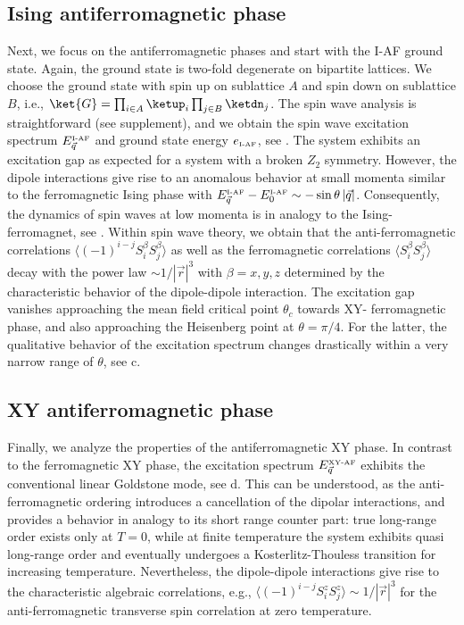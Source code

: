 \subsection{Ising antiferromagnetic phase}
Next, we focus on the antiferromagnetic phases and start with the I-AF ground state.
Again, the ground state is two-fold degenerate on bipartite lattices. We choose the ground state with spin up on sublattice $A$
and spin down on sublattice $B$, i.e., $\ket{G} = \prod_{i \in A} \ketup_{i} \prod_{j\in B} \ketdn_{j}$.
The spin wave analysis is straightforward (see supplement), and we obtain
the spin wave excitation spectrum $ E^{\mbox{\tiny I-AF}}_{\vec q}$ and ground state energy $ e_{\mbox{\tiny I-AF}}$, see .
The system exhibits an excitation gap as expected for a system with a broken $Z_{2}$ symmetry.
However, the dipole interactions give rise to an anomalous behavior at small momenta similar to
the ferromagnetic Ising phase with $E^{\mbox{\tiny I-AF}}_{\vec q}- E^{\mbox{\tiny I-AF}}_{0} \sim -
\sin \theta\, |{\vec q}|$. Consequently, the dynamics of spin waves at low momenta is in analogy to the
Ising-ferromagnet, see . Within spin wave theory, we obtain that the anti-ferromagnetic correlations
$\langle (-1)^{i-j} S_{i}^{\beta}S_{j}^{\beta} \rangle$
as well as the ferromagnetic correlations $\langle S_{i}^{\beta}S_{j}^{\beta} \rangle$ decay with the
power law $\sim1/ |{\vec r}|^{3}$ with $\beta = x,y,z$ determined by the characteristic behavior of the dipole-dipole interaction.
The excitation gap vanishes approaching the mean field critical point $\theta_{c}$ towards XY- ferromagnetic
phase, and also approaching the Heisenberg point at $\theta = \pi/4$. For the latter, the qualitative behavior of the excitation spectrum
changes drastically within a very narrow range of $\theta$, see c.



\subsection{XY antiferromagnetic phase}
Finally, we analyze the properties of the antiferromagnetic XY phase.
In contrast to the ferromagnetic XY phase, the excitation spectrum $E^{\mbox{\tiny XY-AF}}_{\vec q}$
exhibits the conventional linear Goldstone mode, see d. This can be understood, as the
anti-ferromagnetic ordering introduces a cancellation of the dipolar interactions, and provides a behavior in analogy to
its short range counter part: true long-range order exists only at $T=0$, while at finite temperature the system
exhibits quasi long-range order and eventually undergoes a Kosterlitz-Thouless transition for increasing temperature.
Nevertheless, the dipole-dipole interactions give rise to the characteristic algebraic correlations, e.g.,
$\langle (-1)^{i-j}S_{i}^{z}S_{j}^{z} \rangle \sim 1/|{\vec r}|^3$ for the anti-ferromagnetic transverse spin correlation at zero temperature.



